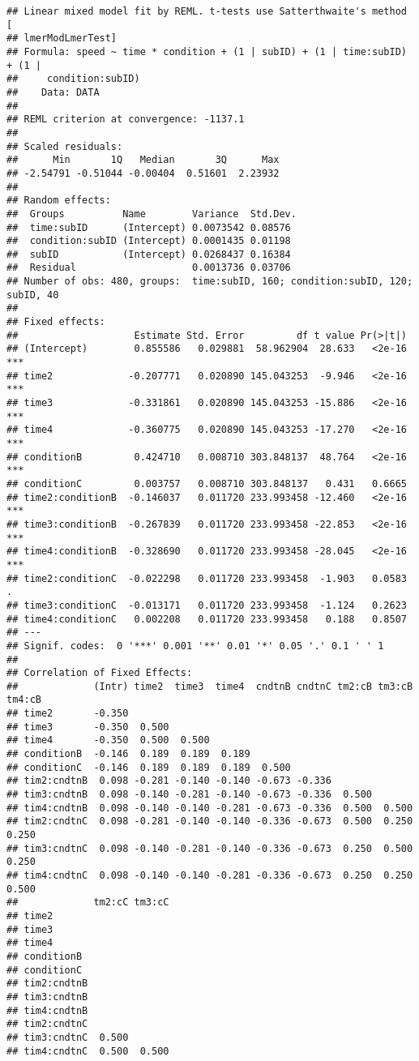 \documentclass[]{article}
\begin{document}
\begin{verbatim}
## Linear mixed model fit by REML. t-tests use Satterthwaite's method [
## lmerModLmerTest]
## Formula: speed ~ time * condition + (1 | subID) + (1 | time:subID) + (1 |  
##     condition:subID)
##    Data: DATA
## 
## REML criterion at convergence: -1137.1
## 
## Scaled residuals: 
##      Min       1Q   Median       3Q      Max 
## -2.54791 -0.51044 -0.00404  0.51601  2.23932 
## 
## Random effects:
##  Groups          Name        Variance  Std.Dev.
##  time:subID      (Intercept) 0.0073542 0.08576 
##  condition:subID (Intercept) 0.0001435 0.01198 
##  subID           (Intercept) 0.0268437 0.16384 
##  Residual                    0.0013736 0.03706 
## Number of obs: 480, groups:  time:subID, 160; condition:subID, 120; subID, 40
## 
## Fixed effects:
##                    Estimate Std. Error         df t value Pr(>|t|)    
## (Intercept)        0.855586   0.029881  58.962904  28.633   <2e-16 ***
## time2             -0.207771   0.020890 145.043253  -9.946   <2e-16 ***
## time3             -0.331861   0.020890 145.043253 -15.886   <2e-16 ***
## time4             -0.360775   0.020890 145.043253 -17.270   <2e-16 ***
## conditionB         0.424710   0.008710 303.848137  48.764   <2e-16 ***
## conditionC         0.003757   0.008710 303.848137   0.431   0.6665    
## time2:conditionB  -0.146037   0.011720 233.993458 -12.460   <2e-16 ***
## time3:conditionB  -0.267839   0.011720 233.993458 -22.853   <2e-16 ***
## time4:conditionB  -0.328690   0.011720 233.993458 -28.045   <2e-16 ***
## time2:conditionC  -0.022298   0.011720 233.993458  -1.903   0.0583 .  
## time3:conditionC  -0.013171   0.011720 233.993458  -1.124   0.2623    
## time4:conditionC   0.002208   0.011720 233.993458   0.188   0.8507    
## ---
## Signif. codes:  0 '***' 0.001 '**' 0.01 '*' 0.05 '.' 0.1 ' ' 1
## 
## Correlation of Fixed Effects:
##             (Intr) time2  time3  time4  cndtnB cndtnC tm2:cB tm3:cB tm4:cB
## time2       -0.350                                                        
## time3       -0.350  0.500                                                 
## time4       -0.350  0.500  0.500                                          
## conditionB  -0.146  0.189  0.189  0.189                                   
## conditionC  -0.146  0.189  0.189  0.189  0.500                            
## tim2:cndtnB  0.098 -0.281 -0.140 -0.140 -0.673 -0.336                     
## tim3:cndtnB  0.098 -0.140 -0.281 -0.140 -0.673 -0.336  0.500              
## tim4:cndtnB  0.098 -0.140 -0.140 -0.281 -0.673 -0.336  0.500  0.500       
## tim2:cndtnC  0.098 -0.281 -0.140 -0.140 -0.336 -0.673  0.500  0.250  0.250
## tim3:cndtnC  0.098 -0.140 -0.281 -0.140 -0.336 -0.673  0.250  0.500  0.250
## tim4:cndtnC  0.098 -0.140 -0.140 -0.281 -0.336 -0.673  0.250  0.250  0.500
##             tm2:cC tm3:cC
## time2                    
## time3                    
## time4                    
## conditionB               
## conditionC               
## tim2:cndtnB              
## tim3:cndtnB              
## tim4:cndtnB              
## tim2:cndtnC              
## tim3:cndtnC  0.500       
## tim4:cndtnC  0.500  0.500
\end{verbatim}
\end{document}
